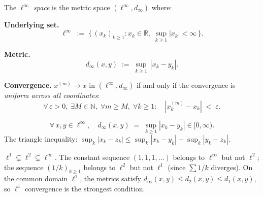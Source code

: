 
\begin{tcolorbox}[colback=propbox, colframe=propborder, arc=2pt,
  left=6pt, right=6pt, top=4pt, bottom=4pt,
  title={\small\textbf{Definition ($\ell^\infty$ — Bounded Sequence Space)}},
  fonttitle=\small\bfseries]
\begin{definition}
\label{def:ellinf}
The \emph{$\ell^\infty$ space} is the metric space $(\ell^\infty, d_\infty)$ where:

\medskip
\noindent\textbf{Underlying set.}
\[
\ell^\infty \;:=\; \bigl\{\,(x_k)_{k \ge 1} : x_k \in \mathbb{R},\;
\sup_{k \ge 1}|x_k| < \infty\,\bigr\}.
\]

\medskip
\noindent\textbf{Metric.}
\[
d_\infty(x,y) \;:=\; \sup_{k \ge 1}\, |x_k - y_k|.
\]

\medskip
\noindent\textbf{Convergence.}\quad
$x^{(m)} \to x$ in $(\ell^\infty, d_\infty)$ if and only if
the convergence is \emph{uniform across all coordinates}:
\[
\forall\,\varepsilon > 0,\;\exists M \in \mathbb{N},\;
\forall m \ge M,\;\forall k \ge 1:\quad
|x^{(m)}_k - x_k| \;<\; \varepsilon.
\]
\end{definition}
\end{tcolorbox}

\begin{remark*}
\[
\forall\, x, y \in \ell^\infty, \quad
d_\infty(x,y) \;=\; \sup_{k \ge 1}|x_k - y_k| \in [0,\infty).
\]
The triangle inequality: $\sup_k|x_k - z_k| \le \sup_k|x_k - y_k| + \sup_k|y_k - z_k|$.
\end{remark*}

\begin{remark*}
$\ell^1 \subsetneq \ell^2 \subsetneq \ell^\infty$.
The constant sequence $(1,1,1,\ldots)$ belongs to $\ell^\infty$ but not
$\ell^2$; the sequence $(1/k)_{k\ge1}$ belongs to $\ell^2$ but not $\ell^1$
(since $\sum 1/k$ diverges).
On the common domain $\ell^1$, the metrics satisfy
$d_\infty(x,y) \le d_2(x,y) \le d_1(x,y)$,
so $\ell^1$ convergence is the strongest condition.
\end{remark*}


